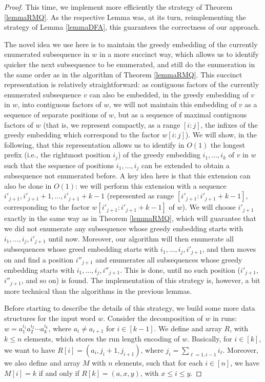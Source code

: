 \documentclass[runningheads,UKenglish,cleveref, autoref, thm-restate]{llncs}
\begin{document}
\begin{proof}
This time, we implement more efficiently the strategy of Theorem \ref{lemmaRMQ}. As the respective Lemma was, at its turn, reimplementing the strategy of Lemma \ref{lemmaDFA}, this guarantees the correctness of our approach. 

The novel idea we use here is to maintain the greedy embedding of the currently enumerated subsequence in $w$ in a more succinct way, which allows us to identify quicker the next subsequence to be enumerated, and still do the enumeration in the same order as in the algorithm of Theorem \ref{lemmaRMQ}. This succinct representation is relatively straightforward: as contiguous factors of the currently enumerated subsequence $v$ can also be embedded, in the greedy embedding of $v$ in $w$, into contiguous factors of $w$, we will not maintain this embedding of $v$ as a sequence of separate positions of $w$, but as a sequence of maximal contiguous factors of $w$ (that is, we represent compactly, as a range $[i:j]$, the infixes of the greedy embedding which correspond to the factor $w[i:j]$). We will show, in the following, that this representation allows us to identify in $O(1)$ the longest prefix (i.e., the rightmost position $i_j$) of the greedy embedding $i_1,\ldots, i_k$ of $v$ in $w$ such that the sequence of positions $i_1,\ldots, i_j$ can be extended to obtain a subsequence not enumerated before. A key idea here is that this extension can also be done in $O(1)$: we will perform this extension with a sequence $i'_{j+1},i'_{j+1}+1,\ldots, i'_{j+1}+k-1$ (represented as range $[i'_{j+1}: i'_{j+1}+k-1]$, corresponding to the factor $w[i'_{j+1}: i'_{j+1}+k-1]$ of $w$). We will choose $i'_{j+1}$ exactly in the same way as in Theorem \ref{lemmaRMQ}, which will guarantee that we did not enumerate any subsequence whose greedy embedding starts with $i_1,\ldots, i_j, i'_{j+1}$ until now. Moreover, our algorithm will then enumerate all subsequences whose greed embedding starts with $i_1,\ldots, i_j, i'_{j+1}$, and then moves on and find a position $i''_{j+1}$ and enumerates all subsequences whose greedy embedding starts with $i_1,\ldots, i_j, i''_{j+1}$. This is done, until no such position ($i'_{j+1}$, $i''_{j+1}$, and so on) is found. The implementation of this strategy is, however, a bit more technical than the algorithms in the previous lemmas.

Before starting to describe the details of this strategy, we build some more data structures for the input word $w$. Consider the decomposition of $w$ in runs: $w=a_1^{i_1}a_2^{i_2}\cdots a_k^{i_k}$, where $a_i\neq a_{i+1}$ for $i\in [k-1]$. We define and array $R$, with $k\leq n$ elements, which stores the run length encoding of $w$. Basically, for $i\in [k]$, we want to have $R[i]=(a_i,j_i+1,j_{i+1})$, where $j_i=\sum_{\ell=1,i-1} i_\ell$. Moreover, we also define and array $M$ with $n$ elements, such that for each $i\in [n]$, we have $M[i]=k$ if and only if $R[k]=(a,x,y)$, with $x\leq i\leq y$. 


\end{proof}
\end{document}
